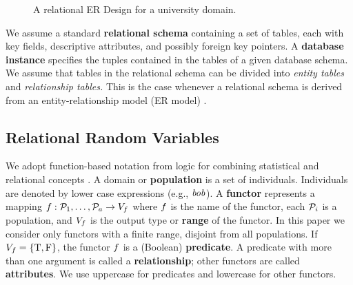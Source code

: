\documentclass{vldb}
\begin{document}
\begin{figure}[htbp] %
 \centering
{} 
\caption{A relational ER Design for a university domain.}
 \label{fig:university-schema}
\end{figure}
 We assume a standard \textbf{relational schema} containing a set of tables, each with key fields, %
descriptive attributes, and possibly foreign key pointers. 
A \textbf{database instance} specifies the tuples contained in the tables of a given database schema. 
We assume that tables in the relational schema can be divided into {\em entity tables} and {\em relationship tables.} 
This is the case whenever a relational schema is derived from an entity-relationship model (ER model) \cite[Ch.2.2]{Ullman1982}. 

\subsection{Relational Random Variables} 
We adopt function-based notation from logic for combining statistical and relational concepts \cite{Russell2010,Getoor2006}.
A domain or \textbf{population} is a set of individuals.
Individuals are denoted by lower case expressions (e.g., $\it{bob}$). 
A \textbf{functor} represents a mapping
$f: \mathcal{P}_{1},\ldots,\mathcal{P}_{a} \rightarrow V_{f}$
where $f$ is the name of the functor, each $\mathcal{P}_{i}$ is a population, and $V_{f}$ is the output type or \textbf{range} of the functor. 
In this paper we consider only functors with a finite range, disjoint from all populations.  If $V_{f} = \{\mathrm{T},\mathrm{F}\}$, the functor $f$ is a (Boolean) \textbf{predicate}. A predicate with more than one argument is called a \textbf{relationship}; other functors are called \textbf{attributes}. We use uppercase for predicates and lowercase for other functors.
\end{document}
